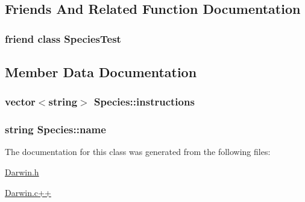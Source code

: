\subsection{Friends And Related Function Documentation}
\hypertarget{classSpecies_abd9e19282b2e2b3fd0bb743940410ba1}{
\subsubsection[{Species\-Test}]{\setlength{\rightskip}{0pt plus 5cm}friend class Species\-Test\hspace{0.3cm}{\ttfamily [friend]}}}\label{classSpecies_abd9e19282b2e2b3fd0bb743940410ba1}


\subsection{Member Data Documentation}
\hypertarget{classSpecies_a2967f1f40745dd4f0b35f837cfaa33a6}{
\subsubsection[{instructions}]{\setlength{\rightskip}{0pt plus 5cm}vector$<$string$>$ Species\-::instructions\hspace{0.3cm}{\ttfamily [private]}}}\label{classSpecies_a2967f1f40745dd4f0b35f837cfaa33a6}
\hypertarget{classSpecies_a11ce4c16866b4947d520bae7fd84cbfb}{
\subsubsection[{name}]{\setlength{\rightskip}{0pt plus 5cm}string Species\-::name\hspace{0.3cm}{\ttfamily [private]}}}\label{classSpecies_a11ce4c16866b4947d520bae7fd84cbfb}


The documentation for this class was generated from the following files\-:\begin{DoxyCompactItemize}
\item 
\hyperlink{Darwin_8h}{Darwin.\-h}\item 
\hyperlink{Darwin_8c_09_09}{Darwin.\-c++}\end{DoxyCompactItemize}
